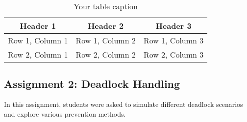 \documentclass[12pt]{article}
\begin{document}
\begin{table}[htbp] %
    \centering
    \begin{tabular}{|c|c|c|} %
    \hline
    Header 1 & Header 2 & Header 3 \\ %
    \hline
    Row 1, Column 1 & Row 1, Column 2 & Row 1, Column 3 \\ %
    \hline
    Row 2, Column 1 & Row 2, Column 2 & Row 2, Column 3 \\ %
    \hline
    \end{tabular}
    \caption{Your table caption} %
    \label{tab:your_label} %
\end{table}

\subsection{Assignment 2: Deadlock Handling}
In this assignment, students were asked to simulate different deadlock scenarios and explore various prevention methods.
\end{document}

